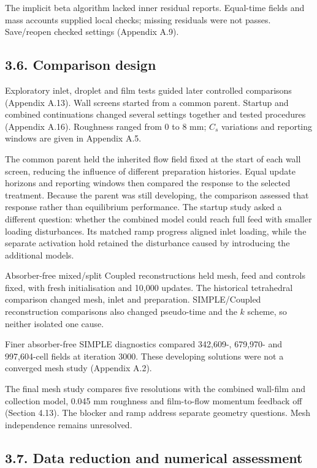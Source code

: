 \documentclass[
  12pt,
  a4paper,
]{article}
\begin{document}
The implicit beta algorithm lacked inner residual reports. Equal-time
fields and mass accounts supplied local checks; missing residuals were
not passes. Save/reopen checked settings (Appendix A.9).

\subsection{3.6. Comparison design}\label{comparison-design}

Exploratory inlet, droplet and film tests guided later controlled
comparisons (Appendix A.13). Wall screens started from a common parent.
Startup and combined continuations changed several settings together and
tested procedures (Appendix A.16). Roughness ranged from 0 to 8 mm;
\(C_s\) variations and reporting windows are given in Appendix A.5.

The common parent held the inherited flow field fixed at the start of
each wall screen, reducing the influence of different preparation
histories. Equal update horizons and reporting windows then compared the
response to the selected treatment. Because the parent was still
developing, the comparison assessed that response rather than
equilibrium performance. The startup study asked a different question:
whether the combined model could reach full feed with smaller loading
disturbances. Its matched ramp progress aligned inlet loading, while the
separate activation hold retained the disturbance caused by introducing
the additional models.

Absorber-free mixed/split Coupled reconstructions held mesh, feed and
controls fixed, with fresh initialisation and 10,000 updates. The
historical tetrahedral comparison changed mesh, inlet and preparation.
SIMPLE/Coupled reconstruction comparisons also changed pseudo-time and
the \(k\) scheme, so neither isolated one cause.

Finer absorber-free SIMPLE diagnostics compared 342,609-, 679,970- and
997,604-cell fields at iteration 3000. These developing solutions were
not a converged mesh study (Appendix A.2).

The final mesh study compares five resolutions with the combined
wall-film and collection model, 0.045 mm roughness and film-to-flow
momentum feedback off (Section 4.13). The blocker and ramp address
separate geometry questions. Mesh independence remains unresolved.

\subsection{3.7. Data reduction and numerical
assessment}\label{data-reduction-and-numerical-assessment}
\end{document}
